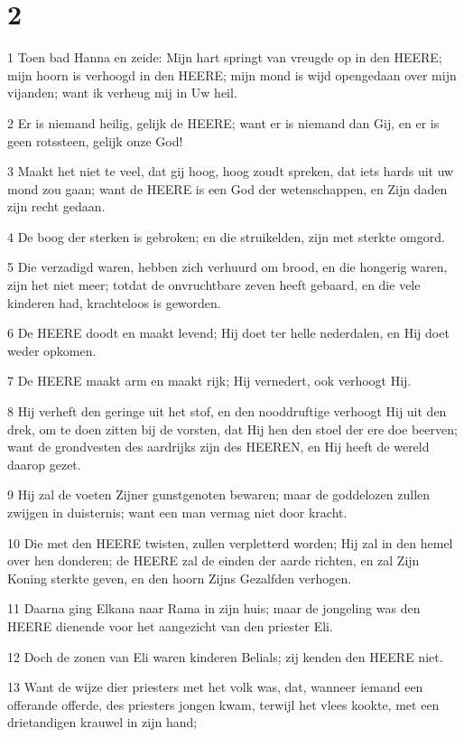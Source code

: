 \chapter{2}

\par 1 Toen bad Hanna en zeide: Mijn hart springt van vreugde op in den HEERE; mijn hoorn is verhoogd in den HEERE; mijn mond is wijd opengedaan over mijn vijanden; want ik verheug mij in Uw heil.
\par 2 Er is niemand heilig, gelijk de HEERE; want er is niemand dan Gij, en er is geen rotssteen, gelijk onze God!
\par 3 Maakt het niet te veel, dat gij hoog, hoog zoudt spreken, dat iets hards uit uw mond zou gaan; want de HEERE is een God der wetenschappen, en Zijn daden zijn recht gedaan.
\par 4 De boog der sterken is gebroken; en die struikelden, zijn met sterkte omgord.
\par 5 Die verzadigd waren, hebben zich verhuurd om brood, en die hongerig waren, zijn het niet meer; totdat de onvruchtbare zeven heeft gebaard, en die vele kinderen had, krachteloos is geworden.
\par 6 De HEERE doodt en maakt levend; Hij doet ter helle nederdalen, en Hij doet weder opkomen.
\par 7 De HEERE maakt arm en maakt rijk; Hij vernedert, ook verhoogt Hij.
\par 8 Hij verheft den geringe uit het stof, en den nooddruftige verhoogt Hij uit den drek, om te doen zitten bij de vorsten, dat Hij hen den stoel der ere doe beerven; want de grondvesten des aardrijks zijn des HEEREN, en Hij heeft de wereld daarop gezet.
\par 9 Hij zal de voeten Zijner gunstgenoten bewaren; maar de goddelozen zullen zwijgen in duisternis; want een man vermag niet door kracht.
\par 10 Die met den HEERE twisten, zullen verpletterd worden; Hij zal in den hemel over hen donderen; de HEERE zal de einden der aarde richten, en zal Zijn Koning sterkte geven, en den hoorn Zijns Gezalfden verhogen.
\par 11 Daarna ging Elkana naar Rama in zijn huis; maar de jongeling was den HEERE dienende voor het aangezicht van den priester Eli.
\par 12 Doch de zonen van Eli waren kinderen Belials; zij kenden den HEERE niet.
\par 13 Want de wijze dier priesters met het volk was, dat, wanneer iemand een offerande offerde, des priesters jongen kwam, terwijl het vlees kookte, met een drietandigen krauwel in zijn hand;
